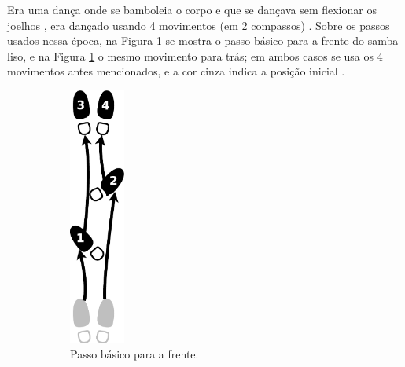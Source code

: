 Era uma dança onde se bamboleia o corpo e que se dançava sem flexionar os joelhos \cite[pp. 58]{freitas1959danca} \cite[pp. 143]{perna2002samba},
era dançado usando 4 movimentos (em 2 compassos) \cite[pp. 62]{freitas1959danca} \cite[pp. 143]{perna2002samba}.
Sobre os passos usados nessa época, 
na Figura \ref{fig:samba-liso-basico-frente} se mostra o passo básico para a frente do samba liso,
e na  Figura \ref{fig:samba-liso-basico-frente} o mesmo movimento para trás; 
em ambos casos se usa os 4 movimentos antes mencionados, e a cor cinza indica a posição inicial \cite[pp. 63]{freitas1959danca}. 
\begin{figure}[h]
    \centering
    \begin{subfigure}[b]{0.3\textwidth}
        \centering
        \includegraphics[width=0.2\textwidth]{chapters/cap-historia-dancasamba/samba-liso-basico-frente.eps}
        \caption{Passo básico para a frente.}
        \label{fig:samba-liso-basico-frente}
    \end{subfigure}
    ~ %
    \begin{subfigure}[b]{0.3\textwidth}
        \centering

\end{subfigure}
\end{figure}
